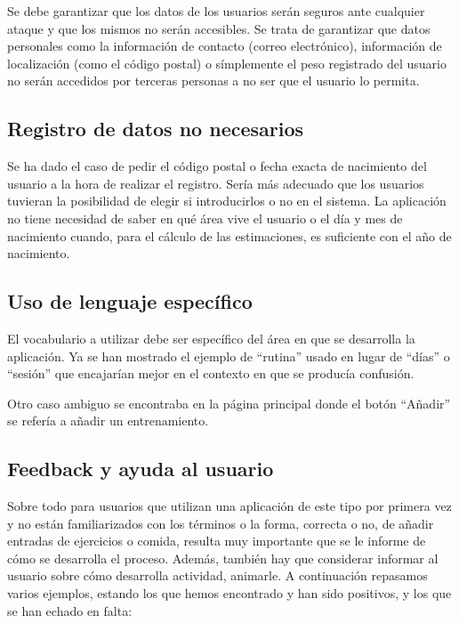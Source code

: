 \documentclass[a4paper]{article}
\begin{document}
	Se debe garantizar que los datos de los usuarios serán seguros ante cualquier ataque y que los mismos no serán accesibles. Se trata de garantizar que datos personales como la información de contacto (correo electrónico), información de localización (como el código postal) o símplemente el peso registrado del usuario no serán accedidos por terceras personas a no ser que el usuario lo permita.
	
	\subsection{Registro de datos no necesarios}
	
	Se ha dado el caso de pedir el código postal o fecha exacta de nacimiento del usuario a la hora de realizar el registro. Sería más adecuado que los usuarios tuvieran la posibilidad de elegir si introducirlos o no en el sistema. La aplicación no tiene necesidad de saber en qué área vive el usuario o el día y mes de nacimiento cuando, para el cálculo de las estimaciones, es suficiente con el año de nacimiento.
	
	\subsection{Uso de lenguaje específico}
	
	El vocabulario a utilizar debe ser específico del área en que se desarrolla la aplicación. Ya se han mostrado el ejemplo de ``rutina'' usado en lugar de ``días'' o ``sesión'' que encajarían mejor en el contexto en que se producía confusión.
	
	Otro caso ambiguo se encontraba en la página principal donde el botón ``Añadir'' se refería a añadir un entrenamiento.
	
	\subsection{Feedback y ayuda al usuario}
	
	Sobre todo para usuarios que utilizan una aplicación de este tipo por primera vez y no están familiarizados con los términos o la forma, correcta o no, de añadir entradas de ejercicios o comida, resulta muy importante que se le informe de cómo se desarrolla el proceso. Además, también hay que considerar informar al usuario sobre cómo desarrolla actividad, animarle.  A continuación repasamos varios ejemplos, estando los que hemos encontrado y han sido positivos, y los que se han echado en falta:
	
\end{document}
